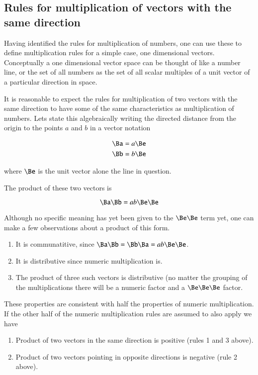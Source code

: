 \documentclass{article}      %
\begin{document}
\subsection{Rules for multiplication of vectors with the same direction}

Having identified the rules for multiplication of numbers, one can use these to define multiplication rules for a simple case, one dimensional vectors.
Conceptually a one dimensional vector space can be thought of like a number line, or the set of all numbers as the set of all scalar multiples of a unit vector of a particular direction in space.

It is reasonable to expect the rules for multiplication of two vectors with the same direction to have some of the same characteristics as multiplication of numbers.  Lets state this algebraically writing the directed distance from the origin to the points $a$ and $b$ in a vector notation

\begin{align*}
\Ba &= a\Be \\
\Bb &= b\Be \\
\end{align*}

where $\Be$ is the unit vector alone the line in question.

The product of these two vectors is

\[
\Ba \Bb = a b \Be \Be
\]

Although no specific meaning has yet been given to the $\Be \Be$ term yet, one can make a few observations about a product of this form.
\begin{enumerate}
\item It is communatitive, since $\Ba \Bb = \Bb \Ba = a b \Be \Be$.
\item It is distributive since numeric multiplication is.
\item The product of three such vectors is distributive (no matter the grouping of the multiplications there will be a numeric factor and a $\Be \Be \Be$ factor.
\end{enumerate}

These properties are consistent with half the properties of numeric multiplication.  If the other half of the numeric multiplication rules are assumed to also apply we have

\begin{enumerate}
\item Product of two vectors in the same direction is positive (rules 1 and 3 above).
\item Product of two vectors pointing in opposite directions is negative (rule 2 above).
\end{enumerate}
\end{document}
